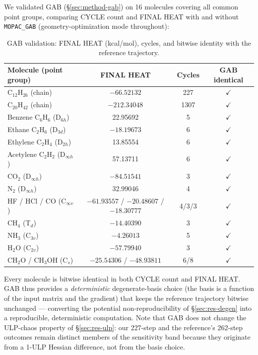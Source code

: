 \documentclass[preprint,12pt]{elsarticle}
\begin{document}
We validated GAB (\S\ref{sec:method-gab}) on 16 molecules covering all common point groups, comparing CYCLE count and FINAL HEAT with and without \texttt{MOPAC\_GAB} (geometry-optimization mode throughout):
\begin{table}[h]
\centering
\caption{GAB validation: FINAL HEAT (kcal/mol), cycles, and bitwise identity with the reference trajectory.}\label{tab:gab}
\begin{tabular}{lccc}
\toprule
Molecule (point group) & FINAL HEAT & Cycles & GAB identical \\
\midrule
C$_{12}$H$_{26}$ (chain) & $-66.52132$ & 227 & $\checkmark$ \\
C$_{20}$H$_{42}$ (chain) & $-212.34048$ & 1307 & $\checkmark$ \\
Benzene C$_6$H$_6$ (D$_{6h}$) & 22.95692 & 5 & $\checkmark$ \\
Ethane C$_2$H$_6$ (D$_{3d}$) & $-18.19673$ & 6 & $\checkmark$ \\
Ethylene C$_2$H$_4$ (D$_{2h}$) & 13.85554 & 6 & $\checkmark$ \\
Acetylene C$_2$H$_2$ (D$_{\infty h}$) & 57.13711 & 6 & $\checkmark$ \\
CO$_2$ (D$_{\infty h}$) & $-84.51541$ & 3 & $\checkmark$ \\
N$_2$ (D$_{\infty h}$) & 32.99046 & 4 & $\checkmark$ \\
HF / HCl / CO (C$_{\infty v}$) & $-61.93557$ / $-20.48607$ / $-18.30777$ & 4/3/3 & $\checkmark$ \\
CH$_4$ (T$_d$) & $-14.40390$ & 3 & $\checkmark$ \\
NH$_3$ (C$_{3v}$) & $-4.26013$ & 5 & $\checkmark$ \\
H$_2$O (C$_{2v}$) & $-57.79940$ & 3 & $\checkmark$ \\
CH$_2$O / CH$_3$OH (C$_s$) & $-25.54306$ / $-48.93811$ & 6/8 & $\checkmark$ \\
\bottomrule
\end{tabular}
\end{table}

Every molecule is bitwise identical in both CYCLE count and FINAL HEAT. GAB thus provides a \emph{deterministic} degenerate-basis choice (the basis is a function of the input matrix and the gradient) that keeps the reference trajectory bitwise unchanged --- converting the potential non-reproducibility of \S\ref{sec:res-degen} into a reproducible, deterministic computation. Note that GAB does not change the ULP-chaos property of \S\ref{sec:res-ulp}: our 227-step and the reference's 262-step outcomes remain distinct members of the sensitivity band because they originate from a 1-ULP Hessian difference, not from the basis choice.
\end{document}
